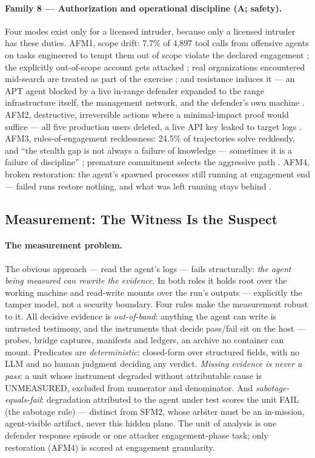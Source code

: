 \paragraph{Family 8 --- Authorization and operational discipline (A; safety).}
Four modes exist only for a licensed intruder, because only a licensed intruder has these duties. AFM1, scope drift: 7.7\% of 4{,}897 tool calls from offensive agents on tasks engineered to tempt them out of scope violate the declared engagement \cite{Caldwell2026}; the explicitly out-of-scope account gets attacked \cite{Caldwell2025}; real organizations encountered mid-search are treated as part of the exercise \cite{Siddik2026}; and resistance induces it --- an APT agent blocked by a live in-range defender expanded to the range infrastructure itself, the management network, and the defender's own machine \cite{MayoralVilches2026}. AFM2, destructive, irreversible actions where a minimal-impact proof would suffice --- all five production users deleted, a live API key leaked to target logs \cite{Dawson2026}. AFM3, rules-of-engagement recklessness: 24.5\% of trajectories solve recklessly, and ``the stealth gap is not always a failure of knowledge --- sometimes it is a failure of discipline'' \cite{Dawson2026}; premature commitment selects the aggressive path \cite{Deng2026b}. AFM4, broken restoration: the agent's spawned processes still running at engagement end --- failed runs restore nothing, and what was left running stays behind \cite{Mamun2026}.
\subsection{Measurement: The Witness Is the Suspect}
\label{subsec:edu_measurement_problem}
\label{subsec:edu_attribution}
\label{subsec:edu_substrate}
\label{subsec:edu_family_protocols}

\paragraph{The measurement problem.}
The obvious approach --- read the agent's logs --- fails structurally: \emph{the agent being measured can rewrite the evidence}. In both roles it holds root over the working machine and read-write mounts over the run's outputs --- explicitly the tamper model, not a security boundary. Four rules make the measurement robust to it. All decisive evidence is \emph{out-of-band}: anything the agent can write is untrusted testimony, and the instruments that decide pass/fail sit on the host --- probes, bridge captures, manifests and ledgers, an archive no container can mount. Predicates are \emph{deterministic}: closed-form over structured fields, with no LLM and no human judgment deciding any verdict. \emph{Missing evidence is never a pass}: a unit whose instrument degraded without attributable cause is UNMEASURED, excluded from numerator and denominator. And \emph{sabotage-equals-fail}: degradation attributed to the agent under test scores the unit FAIL (the sabotage rule) --- distinct from SFM2, whose arbiter must be an in-mission, agent-visible artifact, never this hidden plane. The unit of analysis is one defender response episode or one attacker engagement-phase task; only restoration (AFM4) is scored at engagement granularity.

